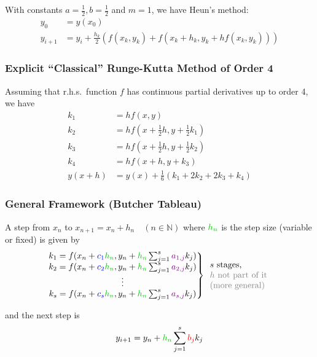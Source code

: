 With constants $a=\frac{1}{2}, b=\frac{1}{2}$ and $m=1$, we have Heun's method:
\begin{align*}
    y_0 & = y(x_0) \\
    y_{i+1} & = y_i + \frac{h_k}{2}\left(f(x_k,y_k)+f(x_k+h_k,y_k+hf(x_k,y_k))\right)
\end{align*}

\subsubsection{Explicit ``Classical'' Runge-Kutta Method of Order 4}

Assuming that r.h.s.\ function $f$ has continuous partial derivatives up to order 4, we have
\begin{align*}
    k_1 & = hf(x,y) \\
    k_2 & = hf(x+\frac{1}{2}h, y+\frac{1}{2}k_1) \\
    k_3 & = hf(x+\frac{1}{2}h, y+\frac{1}{2}k_2) \\
    k_4 & = hf(x+h, y+k_3) \\
    y(x+h) & = y(x) + \frac{1}{6}(k_1+2k_2+2k_3+k_4)
\end{align*}

\subsubsection{General Framework (Butcher Tableau)}

\begin{snugshade*}
    A step from $x_n$ to $x_{n+1}=x_n+h_n\quad(n\in\mathbb{N})$ where ${\color{darkgreen}h_n}$ is the step size (variable or fixed)
    is given by
    \begin{align*}
        \left.
        \begin{matrix}
            k_{1}=f(x_n+{\color{blue}c_1}{\color{darkgreen}h_n},y_n+{\color{darkgreen}h_n}\sum_{j=1}^{s}{\color{purple}a_{1,j}}k_j) \\
            k_{2}=f(x_n+{\color{blue}c_2}{\color{darkgreen}h_n},y_n+{\color{darkgreen}h_n}\sum_{j=1}^{s}{\color{purple}a_{2,j}}k_j) \\
            \vdots                                                                                                                  \\
            k_{s}=f(x_n+{\color{blue}c_s}{\color{darkgreen}h_n},y_n+{\color{darkgreen}h_n}\sum_{j=1}^{s}{\color{purple}a_{s,j}}k_j)
        \end{matrix}
        \right\}
        \begin{array}{l}
            s \text{ stages, } \\
            {\color{gray} h\text{ not part of it}} \\
            {\color{gray} \text{(more general)}}
        \end{array}
    \end{align*}

    and the next step is
    \begin{align*}
        y_{i+1}=y_n+{\color{darkgreen}h_n}\sum_{j=1}^{s}{\color{red}b_j}k_j
    \end{align*}
\end{snugshade*}

